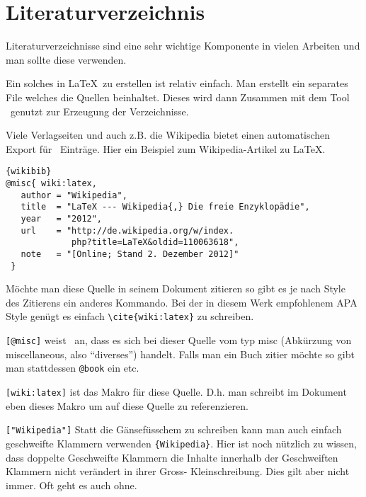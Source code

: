 \section{Literaturverzeichnis}

\noindent
Literaturverzeichnisse sind eine sehr wichtige Komponente
in vielen Arbeiten und man sollte diese verwenden.

Ein solches in \LaTeX~zu erstellen ist relativ einfach. Man
erstellt ein separates File welches die Quellen beinhaltet.
Dieses wird dann Zusammen mit dem Tool \BibTeX~genutzt zur
Erzeugung der Verzeichnisse. 

Viele Verlagseiten und auch z.B. die Wikipedia bietet einen automatischen
Export für \BibTeX~Einträge. Hier ein Beispiel zum Wikipedia-Artikel zu \LaTeX. \cite{wiki:latex}

\begin{center}
\begin{lstlisting}[caption=BibTeX Export aus Wikipedia]{wikibib}
@misc{ wiki:latex,
   author = "Wikipedia",
   title  = "LaTeX --- Wikipedia{,} Die freie Enzyklopädie",
   year   = "2012",
   url    = "http://de.wikipedia.org/w/index.
             php?title=LaTeX&oldid=110063618",
   note   = "[Online; Stand 2. Dezember 2012]"
 }
\end{lstlisting}
\end{center}

\noindent
Möchte man diese Quelle in seinem Dokument zitieren so gibt es je nach Style 
des Zitierens ein anderes Kommando. Bei der in diesem Werk empfohlenem APA Style
genügt es einfach \lstinline|\cite{wiki:latex}| zu schreiben.

\begin{description}
    \item \lstinline|[@misc]| weist \BibTex~an, dass es sich bei dieser Quelle
    vom typ misc (Abkürzung von miscellaneous, also ``diverses'') handelt.
    Falls man ein Buch zitier möchte so gibt man stattdessen \lstinline|@book| 
    ein etc.
    \item \lstinline|[wiki:latex]| ist das Makro für diese Quelle. D.h. man 
    schreibt im Dokument eben dieses Makro um auf diese Quelle zu referenzieren.
    \item \lstinline|["Wikipedia"]| Statt die Gänsefüsschem zu schreiben kann man
    auch einfach geschweifte Klammern verwenden \lstinline|{Wikipedia}|.
    Hier ist noch nützlich zu wissen, dass doppelte Geschweifte Klammern  die 
    Inhalte innerhalb der Geschweiften Klammern nicht verändert in ihrer 
    Gross- Kleinschreibung. Dies gilt aber nicht immer. Oft geht es auch ohne.
\end{description}

